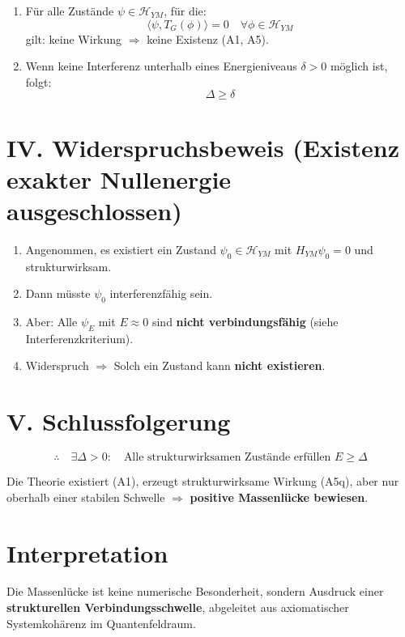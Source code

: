 \documentclass[12pt]{article}
\begin{document}
\begin{enumerate}
  \item Für alle Zustände $\psi \in \mathcal{H}_{YM}$, für die:
  \[ \langle \psi, T_G(\phi) \rangle = 0 \quad \forall \phi \in \mathcal{H}_{YM} \]
  gilt: keine Wirkung $\Rightarrow$ keine Existenz (A1, A5).
  \item Wenn keine Interferenz unterhalb eines Energieniveaus $\delta > 0$ möglich ist, folgt:
  \[ \Delta \geq \delta \]
\end{enumerate}

\section*{IV. Widerspruchsbeweis (Existenz exakter Nullenergie ausgeschlossen)}

\begin{enumerate}
  \item Angenommen, es existiert ein Zustand $\psi_0 \in \mathcal{H}_{YM}$ mit $H_{YM} \psi_0 = 0$ und strukturwirksam.
  \item Dann müsste $\psi_0$ interferenzfähig sein.
  \item Aber: Alle $\psi_E$ mit $E \approx 0$ sind \textbf{nicht verbindungsfähig} (siehe Interferenzkriterium).
  \item Widerspruch $\Rightarrow$ Solch ein Zustand kann \textbf{nicht existieren}.
\end{enumerate}

\section*{V. Schlussfolgerung}

\[ \therefore \quad \exists \Delta > 0 : \quad \text{Alle strukturwirksamen Zustände erfüllen } E \geq \Delta \]

Die Theorie existiert (A1), erzeugt strukturwirksame Wirkung (A5q), aber nur oberhalb einer stabilen Schwelle $\Rightarrow$ \textbf{positive Massenlücke bewiesen}.

\section*{Interpretation}

Die Massenlücke ist keine numerische Besonderheit, sondern Ausdruck einer \textbf{strukturellen Verbindungsschwelle}, abgeleitet aus axiomatischer Systemkohärenz im Quantenfeldraum.
\end{document}
